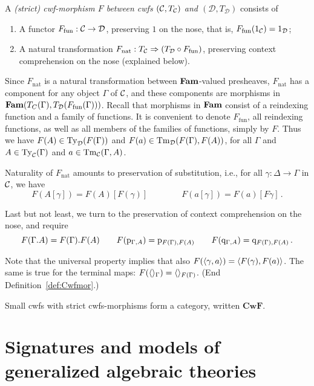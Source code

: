 \documentclass{lmcs}
\def\D{\mathcal{D}}
\def\Cwf{\mathbf{CwF}}
\def\nt{\mathrm{nat}}
\def\fun{\mathrm{fun}}
\begin{document}
\begin{definition}\label{def:Cwfmor}  
A \emph{(strict) cwf-morphism $F$ between cwfs $({\mathcal C},T_{\mathcal C})$ and $(\D,T_\D)$}
consists of

\begin{enumerate}

\item A functor $F_\fun : \C \to \D$, preserving $1$ on the nose,
that is, $F_\fun(1_{\C}) = 1_{\D}$;

\item A natural transformation $F_\nt : T_\C \Rightarrow (T_\D \circ F_\fun)$,
preserving context comprehension on the nose (explained below).

\end{enumerate}
 
Since $F_\nt$ is a natural transformation between $\textbf{Fam}$-valued presheaves,
$F_\nt$ has a component for any object $\Gamma$ of ${\mathcal C}$, and
these components are morphisms in $\Fam(T_C(\Gamma),T_\D(F_\fun(\Gamma)))$.
Recall that morphisms in $\textbf{Fam}$ consist of a reindexing function
and a family of functions. It is convenient to denote $F_\fun$,
all reindexing functions, as well as all members of the families of functions,
simply by $F$. Thus we have $F(A) \in \Ty_\D(F(\Gamma))$ 
and $F(a) \in \Tm_\D(F(\Gamma), F(A))$, for all $\Gamma$
and $A\in\mathrm{Ty}_{\mathcal C}(\Gamma)$ and $a\in \mathrm{Tm}_{\mathcal C}(\Gamma, A)$.

Naturality of $F_\nt$
amounts to preservation of substitution, {i.e.}, for all 
$\gamma : \Delta \to \Gamma$ in ${\mathcal C}$, we have
\[
F(A[\gamma]) = F(A)[F(\gamma)] \qquad \qquad 
F(a[\gamma]) = F(a)[F\gamma]\,.
\]

Last but not least, we turn to the preservation of context comprehension
on the nose, and require
\[ 
F(\Gamma. A) = F(\Gamma). F(A) \qquad
F(\mathrm{p}_{\Gamma, A}) = \mathrm{p}_{F(\Gamma), F(A)} \qquad
F(\mathrm{q}_{\Gamma, A}) = \mathrm{q}_{F(\Gamma), F(A)}\,.
\]

Note that the universal property implies that also
$F(\langle \gamma,a \rangle) = \langle F(\gamma),F(a) \rangle$.
The same is true for the terminal maps:
$F(\langle  \rangle_\Gamma) = \langle  \rangle_{F(\Gamma)}$.
(End Definition~\ref{def:Cwfmor}.)
\end{definition}

Small cwfs with strict cwfs-morphisms form a category, written $\Cwf$. 


\section{Signatures and models of generalized algebraic theories}
\end{document}
